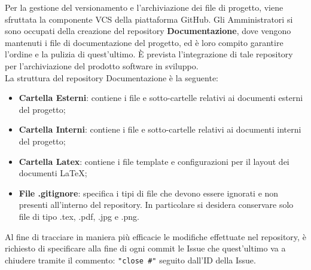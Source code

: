 			Per la gestione del versionamento e l'archiviazione dei file di progetto, viene sfruttata la componente VCS della piattaforma GitHub. Gli Amministratori si sono occupati della creazione del repository \textbf{Documentazione}, dove vengono mantenuti i file di documentazione del progetto, ed è loro compito garantire l'ordine e la pulizia di quest'ultimo. È prevista l'integrazione di tale repository per l'archiviazione del prodotto software in sviluppo. \\
			La struttura del repository Documentazione è la seguente:
			\begin{itemize}
				\item \textbf{Cartella Esterni}: contiene i file e sotto-cartelle relativi ai documenti esterni del progetto;
				\item \textbf{Cartella Interni}: contiene i file e sotto-cartelle relativi ai documenti interni del progetto;
				\item \textbf{Cartella Latex}: contiene i file template e configurazioni per il layout dei documenti \LaTeX{};
				\item \textbf{File .gitignore}: specifica i tipi di file che devono essere ignorati e non presenti all'interno del repository. In particolare si desidera conservare solo file di tipo .tex, .pdf, .jpg e .png.
			\end{itemize}
			Al fine di tracciare in maniera più efficacie le modifiche effettuate nel repository, è richiesto di specificare alla fine di ogni commit le Issue che quest'ultimo va a chiudere tramite il commento: \texttt{"close \#"} seguito dall'ID della Issue.
			
